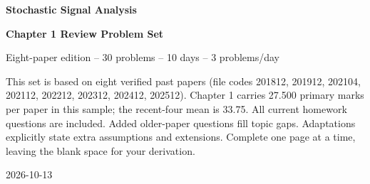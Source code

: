 \documentclass[11pt]{article}
\begin{document}
\begin{titlepage}\centering\vspace*{1.5cm}
{\Huge\bfseries Stochastic Signal Analysis}\par\vspace{1cm}
{\LARGE\bfseries Chapter 1 Review Problem Set}\par\vspace{1cm}
{\large Eight-paper edition -- 30 problems -- 10 days -- 3 problems/day}\par\vspace{1cm}
\begin{tcolorbox}[colback=qbg,colframe=navy]
This set is based on eight verified past papers (file codes 201812, 201912, 202104, 202112, 202212, 202312, 202412, 202512). Chapter 1 carries 27.500 primary marks per paper in this sample; the recent-four mean is 33.75.
All current homework questions are included. Added older-paper questions fill topic gaps. Adaptations explicitly state extra assumptions and extensions. Complete one page at a time, leaving the blank space for your derivation.
\end{tcolorbox}\vfill 2026-10-13\end{titlepage}
\end{document}
